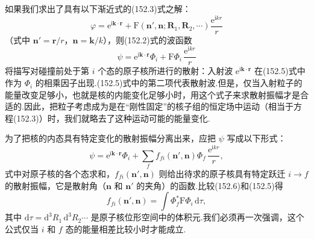 如果我们求出了具有以下渐近式的(152.3)式之解：
\begin{equation}
  \varphi=\mathrm{e}^{\mathrm{i}\boldsymbol{k}\cdot\boldsymbol{r}}
  +\mathrm{F}(\boldsymbol{n}',\boldsymbol{n};\boldsymbol{R}_1,\boldsymbol{R}_2,\cdots)
  \frac{\mathrm{e}^{\mathrm{i}kr}}{r}
\end{equation}
（式中 $\boldsymbol{n}'=\boldsymbol{r}/r$，$\boldsymbol{n}=\boldsymbol{k}/k$），则(152.2)式的波函数
\begin{equation}
  \psi=\mathrm{e}^{\mathrm{i}\boldsymbol{k}\cdot\boldsymbol{r}}\Phi_i
  +\mathrm{F}\Phi_i\,\frac{\mathrm{e}^{\mathrm{i}kr}}{r}
\end{equation}
将描写对碰撞前处于第 $i$ 个态的原子核所进行的散射：入射波 $\mathrm{e}^{\mathrm{i}\boldsymbol{k}\cdot\boldsymbol{r}}$ 在(152.5)式中作为 $\Phi_i$ 的相乘因子出现.(152.5)式中的第二项代表散射波.但是，仅当入射粒子的能量改变足够小，也就是核的内能变化足够小时，用这个式子来求散射振幅才是合适的.因此，把粒子考虑成为是在“刚性固定”的核子组的恒定场中运动（相当于方程(152.3)）时，我们就略去了这种运动可能的能量变化.

为了把核的内态具有特定变化的散射振幅分离出来，应把 $\psi$ 写成以下形式：
\begin{equation}
  \psi=\mathrm{e}^{\mathrm{i}\boldsymbol{k}\cdot\boldsymbol{r}}\Phi_i
  +\sum_ff_{fi}(\boldsymbol{n}',\boldsymbol{n})\Phi_f\,\frac{\mathrm{e}^{\mathrm{i}kr}}{r},
\end{equation}
式中对原子核的各个态求和，$f_{fi}(\boldsymbol{n}',\boldsymbol{n})$ 则给出待求的原子核具有特定跃迁 $i\to f$ 的散射振幅，它是散射角（$\boldsymbol{n}$ 和 $\boldsymbol{n}'$ 的夹角）的函数.比较(152.6)和(152.5)得
\begin{equation}
  f_{fi}(\boldsymbol{n}',\boldsymbol{n})=\int\Phi_f^{*}\mathrm{F}\Phi_i\,\mathrm{d}\tau,
\end{equation}
其中 $\mathrm{d}\tau=\mathrm{d}^3R_1\,\mathrm{d}^3R_2\cdots$ 是原子核位形空间中的体积元.我们必须再一次强调，这个公式仅当 $i$ 和 $f$ 态的能量相差比较小时才能成立.

